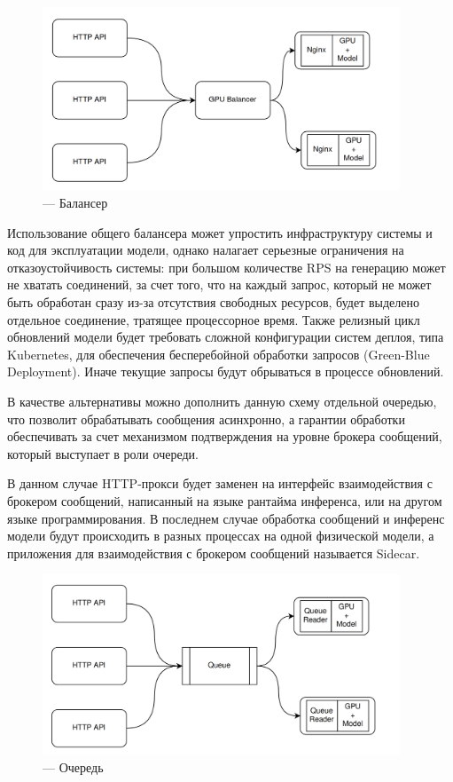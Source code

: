 \begin{figure}[H]
  \centering
  \includegraphics[width=0.95\textwidth]{img/gpu_balancer.png}
  \caption{--- Балансер}
    \label{fig:balancer}
\end{figure}

Использование общего балансера может упростить инфраструктуру системы и код для эксплуатации модели, однако налагает
серьезные ограничения на отказоустойчивость системы: при большом количестве RPS на генерацию может не хватать 
соединений, за счет того, что на каждый запрос, который не может быть обработан сразу из-за отсутствия свободных ресурсов,
будет выделено отдельное соединение, тратящее процессорное время. Также релизный цикл обновлений модели
будет требовать сложной конфигурации систем деплоя, типа Kubernetes, для обеспечения бесперебойной обработки запросов (Green-Blue Deployment).
Иначе текущие запросы будут обрываться в процессе обновлений.

В качестве альтернативы можно дополнить данную схему отдельной очередью, что позволит обрабатывать сообщения асинхронно, а 
гарантии обработки обеспечивать за счет механизмом подтверждения на уровне брокера сообщений, который выступает в роли очереди.

В данном случае HTTP-прокси будет заменен на интерфейс взаимодействия с брокером сообщений, написанный на языке 
рантайма инференса, или на другом языке программирования. В последнем случае обработка сообщений и инференс модели
будут происходить в разных процессах на одной физической модели, а приложения для взаимодействия с брокером сообщений называется 
Sidecar.

\begin{figure}[H]
  \centering
  \includegraphics[width=0.95\textwidth]{img/queue.png}
  \caption{--- Очередь}
    \label{fig:queue}
\end{figure}

